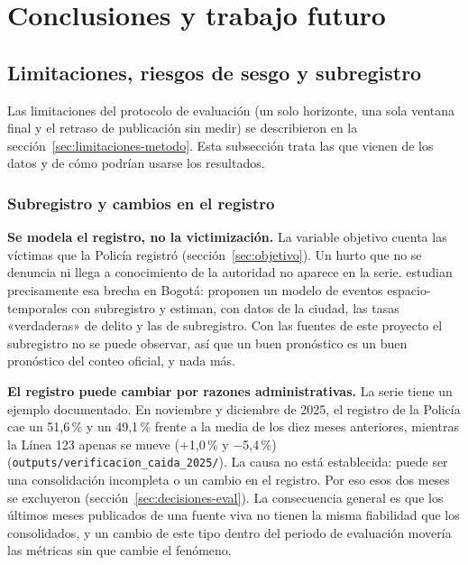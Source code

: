 \section{Conclusiones y trabajo futuro}\label{sec:conclusiones}

\subsection{Limitaciones, riesgos de sesgo y subregistro}\label{sec:limitaciones}

Las limitaciones del protocolo de evaluación (un solo horizonte, una sola ventana final y el retraso de publicación sin medir) se describieron en la sección~\ref{sec:limitaciones-metodo}. Esta subsección trata las que vienen de los datos y de cómo podrían usarse los resultados.

\subsubsection{Subregistro y cambios en el registro}

\textbf{Se modela el registro, no la victimización.} La variable objetivo cuenta las víctimas que la Policía registró (sección~\ref{sec:objetivo}). Un hurto que no se denuncia ni llega a conocimiento de la autoridad no aparece en la serie. \citet{riascos2023} estudian precisamente esa brecha en Bogotá: proponen un modelo de eventos espacio-temporales con subregistro y estiman, con datos de la ciudad, las tasas «verdaderas» de delito y las de subregistro. Con las fuentes de este proyecto el subregistro no se puede observar, así que un buen pronóstico es un buen pronóstico del conteo oficial, y nada más.

\textbf{El registro puede cambiar por razones administrativas.} La serie tiene un ejemplo documentado. En noviembre y diciembre de 2025, el registro de la Policía cae un 51,6\,\% y un 49,1\,\% frente a la media de los diez meses anteriores, mientras la Línea 123 apenas se mueve (+1,0\,\% y $-$5,4\,\%) (\texttt{outputs/\allowbreak{}verificacion\_\allowbreak{}caida\_\allowbreak{}2025/}). La causa no está establecida: puede ser una consolidación incompleta o un cambio en el registro. Por eso esos dos meses se excluyeron (sección~\ref{sec:decisiones-eval}). La consecuencia general es que los últimos meses publicados de una fuente viva no tienen la misma fiabilidad que los consolidados, y un cambio de este tipo dentro del periodo de evaluación movería las métricas sin que cambie el fenómeno.

